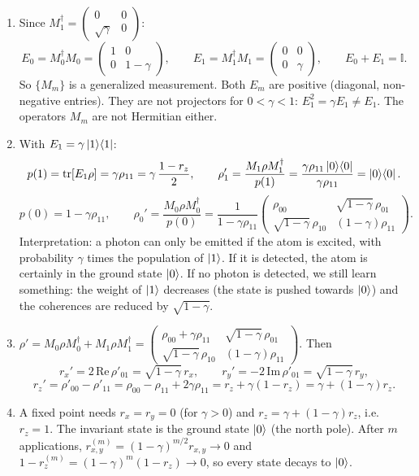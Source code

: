 \documentclass[11pt,a4paper]{article}
\newcommand{\tr}{\operatorname{tr}}
\newcommand{\id}{\mathbb{I}}
\begin{document}
\begin{enumerate}
\item Since $M_1^\dagger=\begin{pmatrix}0&0\\\sqrt\gamma&0\end{pmatrix}$:
\[
E_0=M_0^\dagger M_0=\begin{pmatrix}1&0\\0&1-\gamma\end{pmatrix},\qquad
E_1=M_1^\dagger M_1=\begin{pmatrix}0&0\\0&\gamma\end{pmatrix},\qquad E_0+E_1=\id .
\]
So $\{M_m\}$ is a generalized measurement. Both $E_m$ are positive (diagonal, non-negative entries).
They are not projectors for $0<\gamma<1$: $E_1^2=\gamma E_1\neq E_1$. The operators $M_m$ are not
Hermitian either.

\item With $E_1=\gamma\ket1\!\bra1$:
\[
p(1)=\tr[E_1\rho]=\gamma\rho_{11}=\gamma\,\frac{1-r_z}2,\qquad
\rho_1'=\frac{M_1\rho M_1^\dagger}{p(1)}=\frac{\gamma\rho_{11}\ket0\!\bra0}{\gamma\rho_{11}}=\ket0\!\bra0 .
\]
\[
p(0)=1-\gamma\rho_{11},\qquad
\rho_0'=\frac{M_0\rho M_0^\dagger}{p(0)}=\frac1{1-\gamma\rho_{11}}\begin{pmatrix}\rho_{00}&\sqrt{1-\gamma}\,\rho_{01}\\\sqrt{1-\gamma}\,\rho_{10}&(1-\gamma)\rho_{11}\end{pmatrix}.
\]
Interpretation: a photon can only be emitted if the atom is excited, with probability $\gamma$ times
the population of $\ket1$. If it is detected, the atom is certainly in the ground state $\ket0$. If no
photon is detected, we still learn something: the weight of $\ket1$ decreases (the state is pushed
towards $\ket0$) and the coherences are reduced by $\sqrt{1-\gamma}$.

\item $\rho'=M_0\rho M_0^\dagger+M_1\rho M_1^\dagger=\begin{pmatrix}\rho_{00}+\gamma\rho_{11}&\sqrt{1-\gamma}\,\rho_{01}\\\sqrt{1-\gamma}\,\rho_{10}&(1-\gamma)\rho_{11}\end{pmatrix}$. Then
\[
r_x'=2\,\mathrm{Re}\,\rho'_{01}=\sqrt{1-\gamma}\,r_x,\qquad r_y'=-2\,\mathrm{Im}\,\rho'_{01}=\sqrt{1-\gamma}\,r_y,
\]
\[
r_z'=\rho'_{00}-\rho'_{11}=\rho_{00}-\rho_{11}+2\gamma\rho_{11}=r_z+\gamma(1-r_z)=\gamma+(1-\gamma)r_z .
\]

\item A fixed point needs $r_x=r_y=0$ (for $\gamma>0$) and $r_z=\gamma+(1-\gamma)r_z$, i.e.\ $r_z=1$.
The invariant state is the ground state $\ket0$ (the north pole). After $m$ applications,
$r_{x,y}^{(m)}=(1-\gamma)^{m/2}r_{x,y}\to0$ and $1-r_z^{(m)}=(1-\gamma)^m(1-r_z)\to0$, so every state
decays to $\ket0$.


\end{enumerate}
\end{document}
